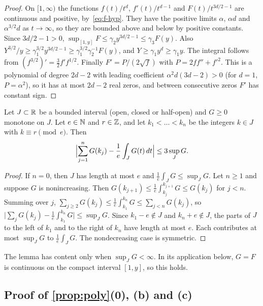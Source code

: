 \begin{proof}
On $[1,\infty)$ the functions $f(t)/t^d$, $f'(t)/t^{d-1}$ and $F(t)/t^{3d/2-1}$ are continuous and positive, by~\eqref{eq:f-hyp}. They have the positive limits $\alpha$, $\alpha d$ and $\alpha^{3/2}d$ as $t\to\infty$, so they are bounded above and below by positive constants. Since $3d/2-1>0$, $\sup_{[1,y]}F\le\gamma_2y^{3d/2-1}\le\gamma_3F(y)$. Also $Y^{3/2}/y\ge\gamma_1^{3/2}y^{3d/2-1}\ge\gamma_1^{3/2}\gamma_2^{-1}F(y)$, and $Y\ge\gamma_1y^d\ge\gamma_1y$. The integral follows from $(f^{3/2})'=\frac32f'f^{1/2}$. Finally $F'=P/(2\sqrt f)$ with $P=2ff''+f'^2$. This is a polynomial of degree $2d-2$ with leading coefficient $\alpha^2d(3d-2)>0$ (for $d=1$, $P=\alpha^2$), so it has at most $2d-2$ real zeros, and between consecutive zeros $F'$ has constant sign.
\end{proof}

\begin{lemma}\label{lem:monotone}
Let $J\subset\mathbb{R}$ be a bounded interval (open, closed or half-open) and $G\ge0$ monotone on $J$. Let $e\in\mathbb{N}$ and $r\in\mathbb{Z}$, and let $k_1<\dots<k_n$ be the integers $k\in J$ with $k\equiv r\pmod e$. Then
\[
\Bigl|\sum_{j=1}^nG(k_j)-\frac1e\int_JG(t)\,dt\Bigr|\le3\sup_JG .
\]
\end{lemma}

\begin{proof}
If $n=0$, then $J$ has length at most $e$ and $\frac1e\int_JG\le\sup_JG$. Let $n\ge1$ and suppose $G$ is nonincreasing. Then $G(k_{j+1})\le\frac1e\int_{k_j}^{k_{j+1}}G\le G(k_j)$ for $j<n$. Summing over $j$, $\sum_{j\ge2}G(k_j)\le\frac1e\int_{k_1}^{k_n}G\le\sum_{j<n}G(k_j)$, so $\bigl|\sum_jG(k_j)-\frac1e\int_{k_1}^{k_n}G\bigr|\le\sup_JG$. Since $k_1-e\notin J$ and $k_n+e\notin J$, the parts of $J$ to the left of $k_1$ and to the right of $k_n$ have length at most $e$. Each contributes at most $\sup_JG$ to $\frac1e\int_JG$. The nondecreasing case is symmetric.
\end{proof}

The lemma has content only when $\sup_JG<\infty$. In its application below, $G=F$ is continuous on the compact interval $[1,y]$, so this holds.

\subsection{Proof of \texorpdfstring{\cref{prop:poly}}{Proposition 8.1}(0), (b) and (c)}

